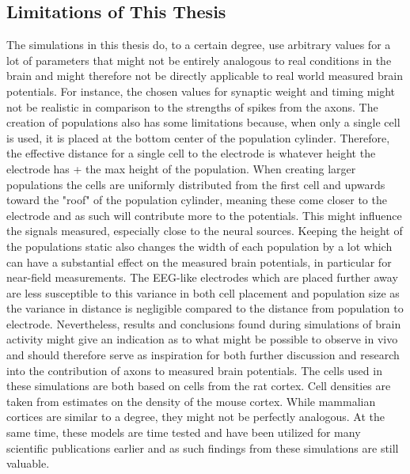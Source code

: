 \documentclass[final, a4paper,masters,en,listoffigures,listoftables,norwegiandates]{NMBU}
\begin{document}
\subsection{Limitations of This Thesis}
The simulations in this thesis do, to a certain degree, use arbitrary values for a lot of parameters that might not be entirely analogous to real conditions in the brain and might therefore not be directly applicable to real world measured brain potentials. For instance, the chosen values for synaptic weight and timing might not be realistic in comparison to  the strengths of spikes from the axons. The creation of populations also has some limitations because, when only a single cell is used, it is placed at the bottom center of the population cylinder. Therefore, the effective distance for a single cell to the electrode is whatever height the electrode has + the max height of the population. When creating larger populations the cells are uniformly distributed from the first cell and upwards toward the "roof" of the population cylinder, meaning these come closer to the electrode and as such will contribute more to the potentials. This might influence the signals measured, especially close to the neural sources. Keeping the height of the populations static also changes the width of each population by a lot which can have a substantial effect on the measured brain potentials, in particular for near-field measurements. The EEG-like electrodes which are placed further away are less susceptible to this variance in both cell placement and population size as the variance in distance is negligible compared to the distance from population to electrode. Nevertheless, results and conclusions found during simulations of brain activity might give an indication as to what might be possible to observe in vivo and should therefore serve as inspiration for both further discussion and research into the contribution of axons to measured brain potentials. 
\newline
The cells used in these simulations are both based on cells from the rat cortex. Cell densities are taken from estimates on the density of the mouse cortex. While mammalian cortices are similar to a degree, they might not be perfectly analogous. At the same time, these models are time tested and have been utilized for many scientific publications earlier and as such findings from these simulations are still valuable.
\newline
\end{document}
